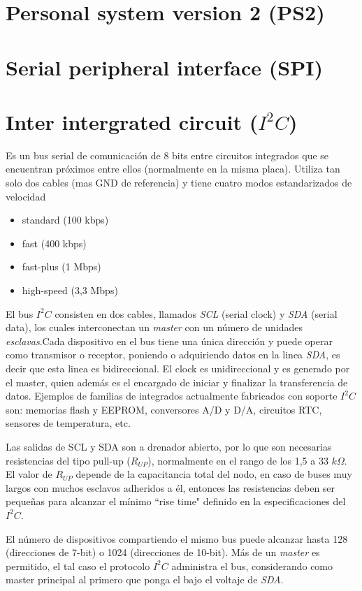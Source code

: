 \documentclass[11pt, a4paper]{article}
\begin{document}
\section{Personal system version 2 (PS2)}

\section{Serial peripheral interface (SPI)}

\section{Inter intergrated circuit ($I^{2}C$)}
		Es un bus serial de comunicación de 8 bits entre circuitos integrados que se encuentran próximos entre ellos (normalmente en la misma placa). Utiliza tan solo dos cables (mas GND de referencia) y tiene cuatro modos estandarizados de velocidad
		\begin{itemize} \itemsep0em
			\item standard (100 kbps)
			\item fast (400 kbps)
			\item fast-plus (1 Mbps)
			\item high-speed (3,3 Mbps)
		\end{itemize}

		El bus $I^{2}C$ consisten en dos cables, llamados \textit{SCL} (serial clock) y \textit{SDA} (serial data), los cuales interconectan un \textit{master} con un número de unidades \textit{esclavas}.Cada dispositivo en el bus tiene una única dirección y puede operar como transmisor o receptor, poniendo o adquiriendo datos en la linea \textit{SDA}, es decir que esta linea es bidireccional. El clock es unidireccional y es generado por el master, quien además es el encargado de iniciar y finalizar la transferencia de datos. Ejemplos de familias de integrados actualmente fabricados con soporte $I^{2}C$ son: memorias flash y EEPROM, conversores A/D y D/A, circuitos RTC, sensores de temperatura, etc.
		
		Las salidas de SCL y SDA son a  drenador abierto, por lo que son necesarias resistencias del tipo pull-up ($R_{UP}$), normalmente en el rango de los 1,5 a 33 $k\Omega$. El valor de $R_{UP}$ depende de la capacitancia total del nodo, en caso de buses muy largos con muchos esclavos adheridos a él, entonces las resistencias deben ser pequeñas para alcanzar el mínimo ``rise time" definido en la especificaciones del $I^{2}C$.

		El número de dispositivos compartiendo el mismo bus puede alcanzar hasta 128 (direcciones de 7-bit) o 1024 (direcciones de 10-bit). Más de un \textit{master} es permitido, el tal caso el protocolo $I^{2}C$ administra el bus, considerando como master principal al primero que ponga el bajo el voltaje de \textit{SDA}.
\end{document}
